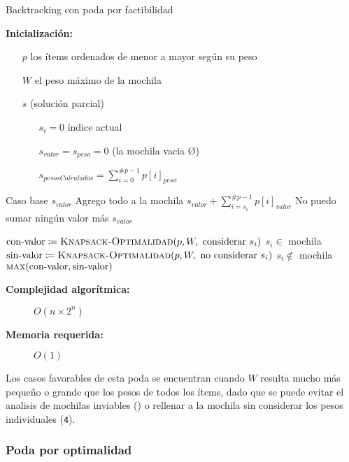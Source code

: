\documentclass[fleqn, 11pt]{article}
\def\is{\coloneqq}
\begin{document}
\begin{algorithm}
\caption{Backtracking con poda por factibilidad}
\begin{algorithmic}[1]
\item[\textbf{Inicialización:}]
\item[] \begin{itemize}
	\item[] $p$ los ítems ordenados de menor a mayor según su peso
	\item[] $W$ el peso máximo de la mochila
	\item[] $s$ (solución parcial)
	\begin{itemize}
		\item[] $s_i = 0$ índice actual
		\item[] $s_{valor} = s_{peso} = 0$ (la mochila vacia \O)
		\item[] $s_{pesosCalculados} = \sum_{i = 0}^{\#p - 1} p[i]_{peso}$
	\end{itemize}
\end{itemize}
\Statex
{}
	\Comment Caso base
	\State \Return $s_{valor}$
\EndIf
{}
	\Comment Agrego todo a la mochila
	\State \Return $s_{valor} + \sum_{i=s_i}^{\#p - 1} p[i]_{valor}$
\EndIf
{}
	\Comment No puedo sumar ningún valor más
	\State \Return $s_{valor}$
\EndIf

\State $\text{con-valor} \is \Call{Knapsack-Optimalidad}{p, W, \text{ considerar } s_i}$
\Comment $s_i \in$ mochila
\State $\text{sin-valor} \is \Call{Knapsack-Optimalidad}{p, W, \text{ no considerar } s_i}$
\Comment $s_i \not\in$ mochila
\State \Return $\Call{max}{\text{con-valor}, \text{sin-valor}}$
\EndFunction
\end{algorithmic}
\begin{description}
	\item[\textbf{Complejidad algorítmica:}] $O(n \times 2^n)$
	\item[\textbf{Memoria requerida:}] $O(1)$
\end{description}
\end{algorithm}

Los casos favorables de esta poda se encuentran cuando $W$ resulta mucho más
pequeño o grande que los pesos de todos los ítems, dado que se puede evitar el
analisis de mochilas inviables () o rellenar a la mochila sin
considerar los pesos individuales (\texttt{4}).

\subsubsection{Poda por optimalidad}
\end{document}
